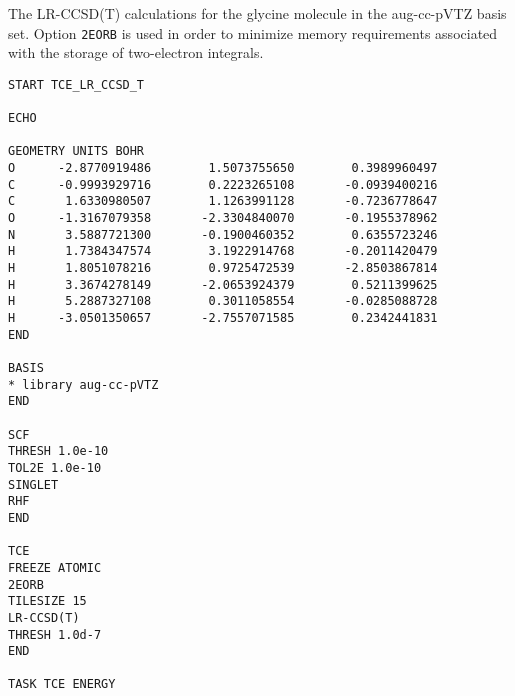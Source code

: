 The LR-CCSD(T) calculations for the glycine molecule in the aug-cc-pVTZ basis set.
Option {\tt 2EORB} is used in order to minimize memory requirements 
associated with the storage of two-electron integrals.

\begin{verbatim}
START TCE_LR_CCSD_T

ECHO

GEOMETRY UNITS BOHR
O      -2.8770919486        1.5073755650        0.3989960497
C      -0.9993929716        0.2223265108       -0.0939400216
C       1.6330980507        1.1263991128       -0.7236778647
O      -1.3167079358       -2.3304840070       -0.1955378962
N       3.5887721300       -0.1900460352        0.6355723246
H       1.7384347574        3.1922914768       -0.2011420479
H       1.8051078216        0.9725472539       -2.8503867814
H       3.3674278149       -2.0653924379        0.5211399625
H       5.2887327108        0.3011058554       -0.0285088728
H      -3.0501350657       -2.7557071585        0.2342441831
END

BASIS
* library aug-cc-pVTZ
END

SCF
THRESH 1.0e-10
TOL2E 1.0e-10
SINGLET
RHF
END

TCE
FREEZE ATOMIC
2EORB
TILESIZE 15
LR-CCSD(T)
THRESH 1.0d-7
END

TASK TCE ENERGY

\end{verbatim} 
